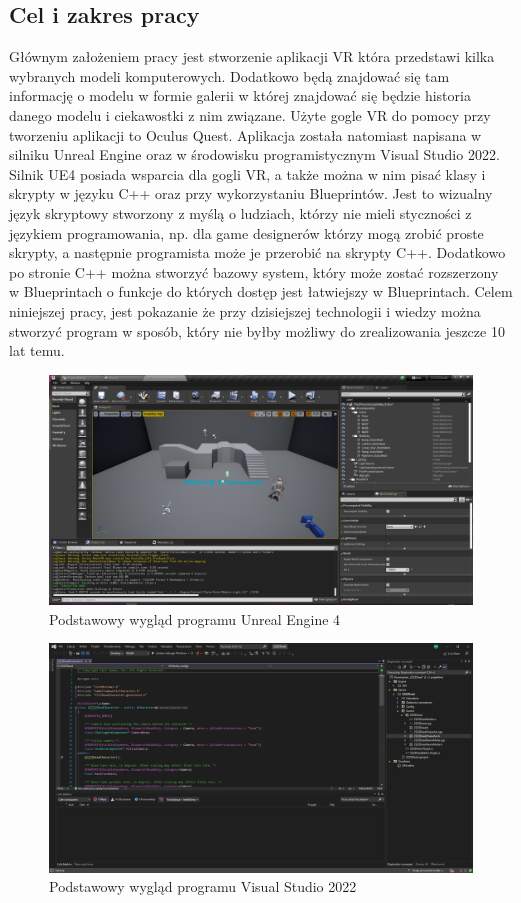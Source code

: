 \documentclass[a4paper,12pt,reqno]{article}
\begin{document}
\subsection{Cel i zakres pracy}

Głównym założeniem pracy jest stworzenie aplikacji VR która przedstawi kilka wybranych
modeli komputerowych. Dodatkowo będą znajdować się tam informację o modelu w formie galerii w
której znajdować się będzie historia danego modelu i ciekawostki z nim związane.
Użyte gogle VR do pomocy przy tworzeniu aplikacji to Oculus Quest. Aplikacja została natomiast napisana w silniku Unreal Engine oraz w środowisku programistycznym Visual Studio 2022. Silnik UE4 posiada wsparcia dla gogli VR, a także można w nim pisać klasy i skrypty w języku C++ oraz przy wykorzystaniu Blueprintów. Jest to wizualny język skryptowy stworzony z myślą o ludziach, którzy nie mieli styczności z językiem programowania, np. dla game designerów którzy  mogą zrobić proste skrypty, a następnie programista może je przerobić na skrypty C++. Dodatkowo po stronie C++ można stworzyć bazowy system, który może zostać rozszerzony w Blueprintach o funkcje do których dostęp jest łatwiejszy w Blueprintach. Celem niniejszej pracy, jest pokazanie że przy dzisiejszej technologii i wiedzy można stworzyć program w sposób, który nie
byłby możliwy do zrealizowania jeszcze 10 lat temu.

\begin{figure}[H]%
\centering
\includegraphics[width=0.8\columnwidth]{graphics/UE4View.png}
\caption{Podstawowy wygląd programu Unreal Engine 4
\label{OpenBrush}}%
%
\qquad
\end{figure}  

\begin{figure}[H]%
\centering
\includegraphics[width=0.8\columnwidth]{graphics/VSView.png}
\caption{Podstawowy wygląd programu Visual Studio 2022
\label{OpenBrush}}%
%
\qquad
\end{figure}  
\end{document}
